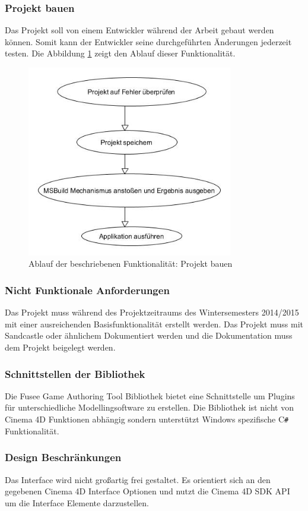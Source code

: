 \documentclass[pagesize, paper=a4, fontsize=12pt, titlepage=true, headings=small, headnosepline, abstractoff, liststotoc, nochapterprefix, plainheadsepline, twoside]{scrreprt}
\newcommand{\CSS}{C\texttt{\# }}
\begin{document}
\subsubsection{Projekt bauen}
Das Projekt soll von einem Entwickler während der Arbeit gebaut werden können. Somit kann der Entwickler seine durchgeführten Änderungen jederzeit testen. Die Abbildung \ref{re:projektbauen} zeigt den Ablauf dieser Funktionalität.
\begin{figure}[ht]
	\centering
	\includegraphics[width=9cm]{Bilder/ProjektBauen.jpg}
	\caption{Ablauf der beschriebenen Funktionalität: Projekt bauen}
	\label{re:projektbauen}
\end{figure}

\subsubsection{Nicht Funktionale Anforderungen}
Das Projekt muss während des Projektzeitraums des Wintersemesters 2014/2015 mit einer ausreichenden Basisfunktionalität erstellt werden.
Das Projekt muss mit Sandcastle oder ähnlichem Dokumentiert werden und die Dokumentation muss dem Projekt beigelegt werden.

\subsubsection{Schnittstellen der Bibliothek}
Die Fusee Game Authoring Tool Bibliothek bietet eine Schnittstelle um Plugins für unterschiedliche Modellingsoftware zu erstellen.  Die Bibliothek ist nicht von Cinema 4D Funktionen abhängig sondern unterstützt Windows spezifische \CSS Funktionalität. 

\subsubsection{Design Beschränkungen}
Das Interface wird nicht großartig frei gestaltet. Es orientiert sich an den gegebenen Cinema 4D Interface Optionen und nutzt die Cinema 4D SDK API um die Interface Elemente darzustellen.
\end{document}
